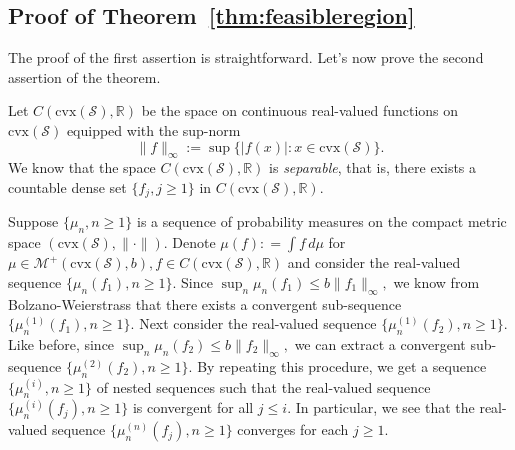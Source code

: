 \documentclass[stsy,sglanonrev]{informs4}
\begin{document}
\begin{APPENDICES}

\section{Proof of Theorem~\ref{thm:feasibleregion}}\label{sec:prooffeasibleregion}
The proof of the first assertion is straightforward. Let's now prove the second assertion of the theorem.  

Let $C(\mbox{cvx}(\mathcal{S}), \mathbb{R})$ be the space on continuous real-valued functions on $\mbox{cvx}(\mathcal{S})$ equipped with the sup-norm $$\|f\|_{\infty} := \sup \{|f(x)|: x \in \mbox{cvx}(\mathcal{S})\}.$$ We know that the space $C(\mbox{cvx}(\mathcal{S}), \mathbb{R})$ is \emph{separable}, that is, there exists a countable dense set $\{f_j, j \geq 1\}$ in  $C(\mbox{cvx}(\mathcal{S}), \mathbb{R})$. 

Suppose $\{\mu_n, n \geq 1\}$ is a sequence of probability measures on the compact metric space $(\mbox{cvx}(\mathcal{S}), \| \cdot\|)$. Denote $\mu(f) : = \int f \, d\mu$ for $\mu \in \mathcal{M}^+(\mbox{cvx}(\mathcal{S}),b), f \in C(\mbox{cvx}(\mathcal{S}),\mathbb{R})$ and consider the real-valued sequence $\{\mu_n(f_1), n\geq 1\}$. Since $\sup_{n} \mu_n(f_1) \leq b\|f_1\|_{\infty},$ we know from Bolzano-Weierstrass that there exists a convergent sub-sequence $\{\mu_n^{(1)}(f_1), n \geq 1\}$. Next consider the real-valued sequence $\{\mu_n^{(1)}(f_2), n \geq 1\}.$ Like before, since $\sup_{n} \mu_n(f_2) \leq b\|f_2\|_{\infty},$ we can extract a convergent sub-sequence $\{\mu_n^{(2)}(f_2), n \geq 1\}$. By repeating this procedure, we get a sequence $\{\mu_n^{(i)}, n \geq 1\}$ of nested sequences such that the real-valued sequence $\{\mu_n^{(i)}(f_j), n \geq 1\}$ is convergent for all $j \leq i$. In particular, we see that the real-valued sequence $\{\mu^{(n)}_n(f_j), n \geq 1\}$ converges for each $j \geq 1$. 


\end{APPENDICES}
\end{document}
